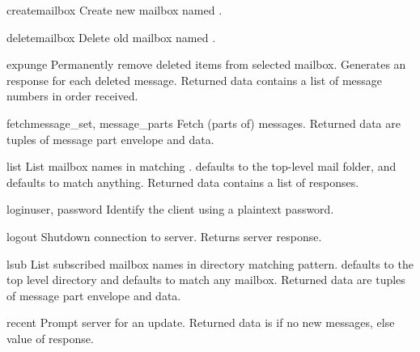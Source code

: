 \begin{methoddesc}{create}{mailbox}
  Create new mailbox named .
\end{methoddesc}

\begin{methoddesc}{delete}{mailbox}
  Delete old mailbox named .
\end{methoddesc}

\begin{methoddesc}{expunge}{}
  Permanently remove deleted items from selected mailbox. Generates an
   response for each deleted message. Returned data
  contains a list of  message numbers in order
  received.
\end{methoddesc}

\begin{methoddesc}{fetch}{message_set, message_parts}
  Fetch (parts of) messages. Returned data are tuples of message part
  envelope and data.
\end{methoddesc}

\begin{methoddesc}{list}{}
  List mailbox names in  matching
  .   defaults to the top-level mail
  folder, and  defaults to match anything.  Returned data
  contains a list of  responses.
\end{methoddesc}

\begin{methoddesc}{login}{user, password}
  Identify the client using a plaintext password.
\end{methoddesc}

\begin{methoddesc}{logout}{}
  Shutdown connection to server. Returns server  response.
\end{methoddesc}

\begin{methoddesc}{lsub}{}
  List subscribed mailbox names in directory matching pattern.
   defaults to the top level directory and
   defaults to match any mailbox.
  Returned data are tuples of message part envelope and data.
\end{methoddesc}

\begin{methoddesc}{recent}{}
  Prompt server for an update. Returned data is  if no new
  messages, else value of  response.
\end{methoddesc}

